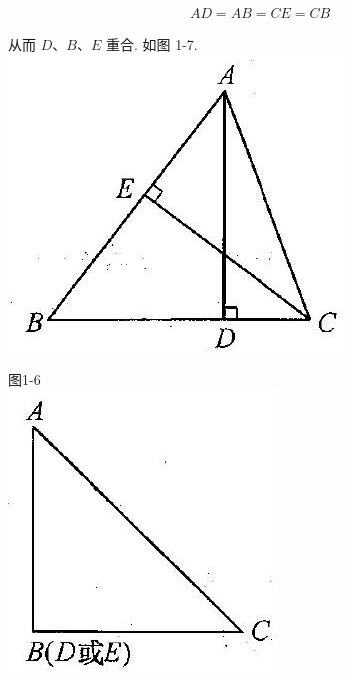\documentclass[10pt]{article}
\begin{document}
\begin{align*}
A D=A B=C E=C B
\end{align*}

从而 $D 、 B 、 E$ 重合. 如图 1-7.\\
\includegraphics[max width=\textwidth, center]{2024_10_30_2c8f45efd4a519b08e1ag-010}

图1-6\\
\includegraphics[max width=\textwidth, center]{2024_10_30_2c8f45efd4a519b08e1ag-010(2)}
\end{document}
